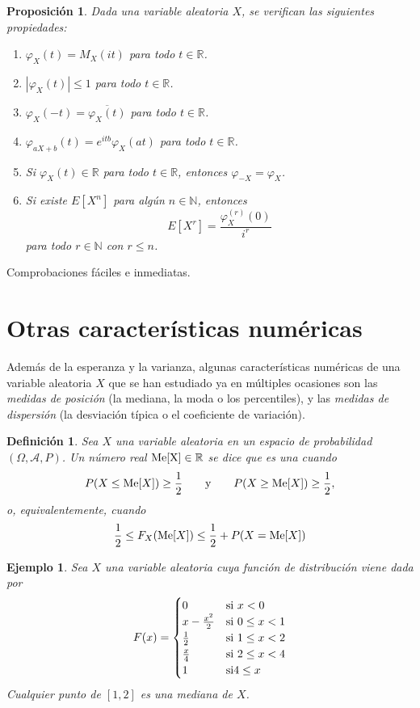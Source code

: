\documentclass[11pt]{report}
\makeatletter
\renewenvironment{proof}[1][\proofname]{\par
  \pushQED{\qed}%
  \normalfont \topsep\z@skip %
  \trivlist
  \item[\hskip\labelsep
        \itshape
    #1\@addpunct{.}]\ignorespaces
}{%
  \popQED\endtrivlist\@endpefalse
}
\theoremstyle{mytheorem}
\newtheorem{proposition}{Proposición}
\theoremstyle{mydefinition}
\newtheorem{definition}{Definición}
\theoremstyle{myexample}
\newtheorem*{example}{Ejemplo}
\let\oldproofname=\proofname
\renewcommand{\proofname}{\rm\bf{\oldproofname}}}
\newenvironment{cdefinition} %
  {\begin{mdframed}[
        linewidth=3pt,
        linecolor=c1,
        bottomline=false,
        topline=false,
        rightline=false,
        innerrightmargin=0pt,
        innertopmargin=0pt,
        innerbottommargin=0pt,
        innerleftmargin=1em,
        skipabove=\baselineskip]
    \begin{definition}}
  {\end{definition}\end{mdframed}}
\newenvironment{cproposition} %
  {\begin{mdframed}[
        linewidth=3pt,
        linecolor=c2,
        bottomline=false,
        topline=false,
        rightline=false,
        innerrightmargin=0pt,
        innertopmargin=0pt,
        innerbottommargin=0pt,
        innerleftmargin=1em,
        skipabove=\baselineskip]
    \begin{proposition}}
  {\end{proposition}\end{mdframed}}
\newcommand{\R}{\mathbb R}
\newcommand{\N}{\mathbb N}
\newcommand{\mybf}[1]{\boldmath\textbf{\color{c1}#1}\unboldmath} %
\makeatother
\begin{document}
\begin{cproposition}
Dada una variable aleatoria $X$, se verifican las siguientes propiedades:
\begin{enumerate}
    \item $\varphi_X(t) = M_X(it)$ para todo $t \in \R$.
    \item $|\varphi_X(t)| \leq 1$ para todo $t \in \R$.
    \item $\varphi_X(-t) = \overline{\varphi_X(t)}$ para todo $t \in \R$.
    \item $\varphi_{aX+b}(t)=e^{itb}\varphi_X(at)$ para todo $t \in \R$.
    \item Si $\varphi_X(t) \in \R$ para todo $t \in \R$, entonces $\varphi_{-X}=\varphi_X$.
    \item Si existe $E[X^n]$ para algún $n \in \N$, entonces
    \[E[X^r] = \frac{\varphi_X^{(r)}(0)}{i^r}\]
    para todo $r \in \N$ con $r \leq n$.
\end{enumerate}
\end{cproposition}
\begin{proof}
Comprobaciones fáciles e inmediatas.
\end{proof}

\section{Otras características numéricas}

\vspace{-0.5\baselineskip}

Además de la esperanza y la varianza, algunas características numéricas de una variable aleatoria $X$ que se han estudiado ya en múltiples ocasiones son las \textit{medidas de posición} (la mediana, la moda o los percentiles), y las \textit{medidas de dispersión} (la desviación típica o el coeficiente de variación).

\begin{cdefinition}
Sea $X$ una variable aleatoria en un espacio de probabilidad $(\Omega,\mathcal{A},P)$. Un número real $\textup{Me[X]} \in \R$ se dice que es una \mybf{{mediana de $\bm{X}$}} cuando
\[P(X \leq \textup{Me}[X]) \geq \frac{1}{2} \qquad \textup{y} \qquad P(X \geq \textup{Me}[X]) \geq \frac{1}{2},\]
o, equivalentemente, cuando
\[\frac{1}{2} \leq F_X(\textup{Me}[X]) \leq \frac{1}{2}+P(X= \textup{Me}[X])\]
\end{cdefinition}

\begin{example}
Sea $X$ una variable aleatoria cuya función de distribución viene dada por
\[F(x)= \begin{cases}
    0 & $si$ \ x < 0 \\
    x-\frac{x^2}{2} & $si$ \ 0 \leq x < 1 \\
    \frac{1}{2} & $si$ \ 1 \leq x < 2 \\
    \frac{x}{4} & $si$ \ 2 \leq x < 4 \\
    1 & $si$ 4 \leq x
\end{cases}\]
Cualquier punto de $[1,2]$ es una mediana de $X$.
\end{example}
\end{document}
